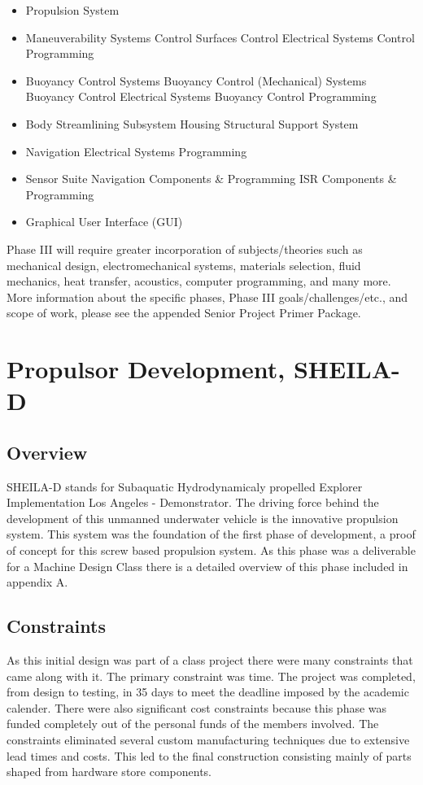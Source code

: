 \documentclass{report}
\begin{document}
\begin{itemize}
\item Propulsion System
\item Maneuverability Systems
\subitem Control Surfaces
\subitem Control Electrical Systems
\subitem Control Programming
\item Buoyancy Control Systems
\subitem Buoyancy Control (Mechanical) Systems
\subitem Buoyancy Control Electrical Systems
\subitem Buoyancy Control Programming
\item Body
\subitem Streamlining
\subitem Subsystem Housing
\subitem Structural Support System
\item Navigation
\subitem Electrical Systems
\subitem Programming
\item Sensor Suite
\subitem Navigation Components \& Programming
\subitem ISR Components \& Programming
\item	Graphical User Interface (GUI)
\end{itemize}
Phase III will require greater incorporation of subjects/theories such as mechanical design, electromechanical systems, materials selection, fluid mechanics, heat transfer, acoustics, computer programming, and many more. More information about the specific phases, Phase III goals/challenges/etc., and scope of work, please see the appended Senior Project Primer Package.
\chapter{Propulsor Development, SHEILA-D}
\section{Overview}
SHEILA-D stands for Subaquatic Hydrodynamicaly propelled Explorer Implementation Los Angeles - Demonstrator. The driving force behind the development of this unmanned underwater vehicle is the innovative propulsion system. This system was the foundation of the first phase of development, a proof of concept for this screw based propulsion system. As this phase was a deliverable for a Machine Design Class there is a detailed overview of this phase included in appendix A. 
\section{Constraints}
As this initial design was part of a class project there were many constraints that came along with it. The primary constraint was time. The project was completed, from design to testing, in 35 days to meet the deadline imposed by the academic calender. There were also significant cost constraints because this phase was funded completely out of the personal funds of the members involved. The constraints eliminated several custom manufacturing techniques due to extensive lead times and costs. This led to the final construction consisting mainly of parts shaped from hardware store components.
\end{document}
